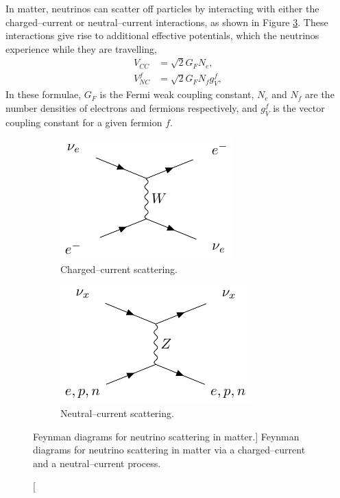In matter, neutrinos can scatter off particles by interacting with either
the charged--current or neutral--current interactions, as shown in Figure
\ref{fig:nu_in_matter}. These interactions give rise to additional effective
potentials, which the neutrinos experience while they are travelling,
\begin{align*}
	V_{CC} &= \sqrt{2} G_F N_e, \\
	V_{NC}^f &= \sqrt{2} G_F N_f g_V^f,
\end{align*}
In these formulae, $G_F$ is the Fermi weak coupling constant, $N_e$ and $N_f$ 
are the number densities of electrons and fermions respectively, and 
$g_V^f$ is the vector coupling constant for a given fermion $f$.
\begin{figure}
	\centering

	\begin{subfigure}[b]{0.49\textwidth}
		\includegraphics[width=\textwidth]{latex_extras/ne_cc.pdf}
		\caption{Charged--current scattering.}
		\label{fig:nu_cc}
	\end{subfigure}
	\hfill
	\begin{subfigure}[b]{0.49\textwidth}
		\includegraphics[width=\textwidth]{latex_extras/n_nc.pdf}
		\caption{Neutral--current scattering.}
		\label{fig:nu_nc}
	\end{subfigure}

	\caption
	[Feynman diagrams for neutrino scattering in matter.]
	{Feynman diagrams for neutrino scattering in matter via a charged--current and 
	a neutral--current process.}

	\label{fig:nu_in_matter}
\end{figure}

